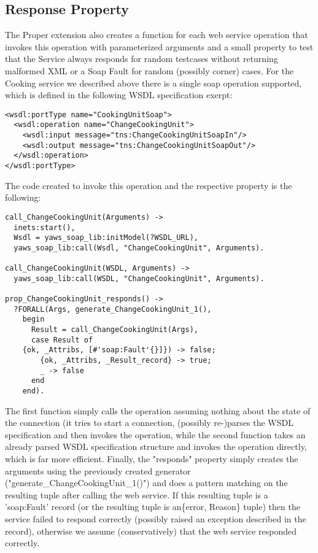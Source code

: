 \documentclass[submission,copyright]{eptcs}
\begin{document}
\subsection{Response Property}

The Proper extension also creates a function for each web service operation that invokes this operation with parameterized arguments and a small property to test that the Service always responds for random testcases without returning malformed XML or a Soap Fault for random (possibly corner) cases. For the Cooking service we described above there is a single soap operation supported, which is defined in the following WSDL specification exerpt:

\begin{lstlisting}
<wsdl:portType name="CookingUnitSoap">
  <wsdl:operation name="ChangeCookingUnit">
    <wsdl:input message="tns:ChangeCookingUnitSoapIn"/>
    <wsdl:output message="tns:ChangeCookingUnitSoapOut"/>
  </wsdl:operation>
</wsdl:portType>
\end{lstlisting}

The code created to invoke this operation and the respective property is the following:

\begin{lstlisting}
call_ChangeCookingUnit(Arguments) ->
  inets:start(),
  Wsdl = yaws_soap_lib:initModel(?WSDL_URL),
  yaws_soap_lib:call(Wsdl, "ChangeCookingUnit", Arguments).

call_ChangeCookingUnit(WSDL, Arguments) ->
  yaws_soap_lib:call(WSDL, "ChangeCookingUnit", Arguments).

prop_ChangeCookingUnit_responds() ->
  ?FORALL(Args, generate_ChangeCookingUnit_1(),
    begin
      Result = call_ChangeCookingUnit(Args),
      case Result of
	{ok, _Attribs, [#'soap:Fault'{}]}) -> false;
        {ok, _Attribs, _Result_record} -> true;
        _ -> false
      end
    end).
\end{lstlisting}

The first function simply calls the operation assuming nothing about the state of the connection (it tries to start a connection, (possibly re-)parses the WSDL specification and then invokes the operation, while the second function takes an already parsed WSDL specification structure and invokes the operation directly, which is far more efficient. Finally, the "responds" property simply creates the arguments using the previously created generator ("generate\_ChangeCookingUnit\_1()") and does a pattern matching on the resulting tuple after calling the web service. If this resulting tuple is a 'soap:Fault' record (or the resulting tuple is an\{error, Reason\} tuple) then the service failed to respond correctly (possibly raised an exception described in the record), otherwise we assume (conservatively) that the web service responded correctly.
\end{document}
